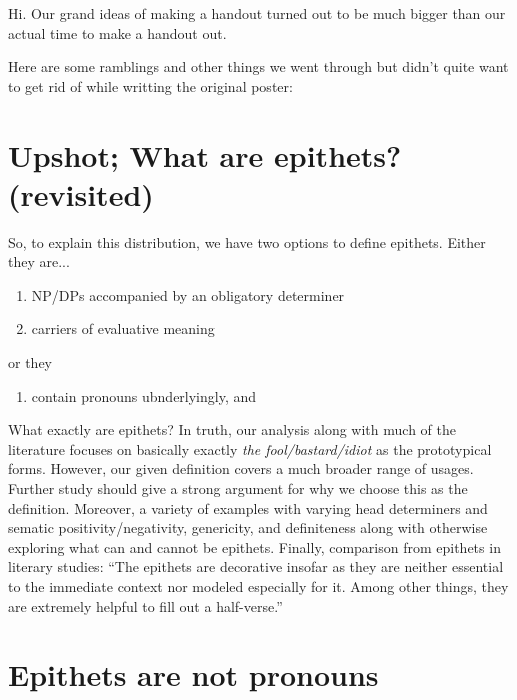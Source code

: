 \documentclass{article}
\begin{document}
Hi. Our grand ideas of making a handout turned out to be much bigger than our actual time to make a handout out.

Here are some ramblings and other things we went through but didn't quite want to get rid of while writting the original poster:

\section{Upshot; What are epithets? (revisited)}
So, to explain this distribution, we have two options to define epithets. Either they are...
\begin{enumerate}[label=$\star$]
	\item NP/DPs accompanied by an obligatory determiner
	\item carriers of evaluative meaning
\end{enumerate}
or they
\begin{enumerate}[label=$\star$]
	\item contain pronouns ubnderlyingly, and
\end{enumerate}
\cite{aounEpithets2000,patel-groszEpithetsSyntaxsemanticsInterface2015,pottsExpressiveDimension2007,schlenkerMinimizeRestrictorsNotes2005}

\begin{exe}
	\label{ex:classic-epithet}
\end{exe}

What exactly are epithets? In truth, our analysis along with much of the literature focuses on basically exactly \textit{the fool/bastard/idiot} as the prototypical forms. However, our given definition covers a much broader range of usages. Further study should give a strong argument for why we choose this as the definition. Moreover, a variety of examples with varying head determiners and sematic positivity/negativity, genericity, and definiteness along with otherwise exploring what can and cannot be epithets. Finally, comparison from epithets in literary studies: ``The epithets are decorative insofar as they are neither essential to the immediate context nor modeled especially for it. Among other things, they are extremely helpful to fill out a half-verse.'' \cite{burkertEbookOrientalizingRevolution1992}

\section{Epithets are not pronouns} %
\end{document}
